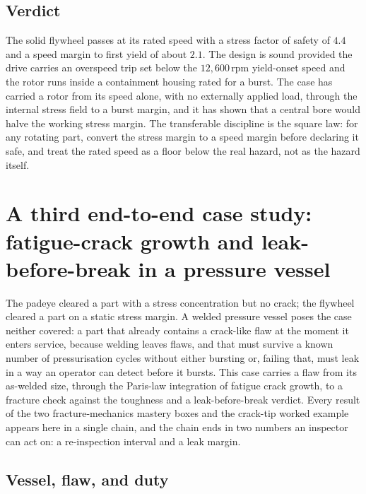 \subsection{Verdict}

The solid flywheel passes at its rated speed with a stress factor of
safety of $4.4$ and a speed margin to first yield of about $2.1$. The
design is sound provided the drive carries an overspeed trip set below
the $12{,}600\,\text{rpm}$ yield-onset speed and the rotor runs inside a
containment housing rated for a burst. The case has carried a rotor from
its speed alone, with no externally applied load, through the internal
stress field to a burst margin, and it has shown that a central bore
would halve the working stress margin. The transferable discipline is
the square law: for any rotating part, convert the stress margin to a
speed margin before declaring it safe, and treat the rated speed as a
floor below the real hazard, not as the hazard itself.

\section{A third end-to-end case study: fatigue-crack growth and
leak-before-break in a pressure vessel}

The padeye cleared a part with a stress concentration but no crack; the
flywheel cleared a part on a static stress margin. A welded pressure
vessel poses the case neither covered: a part that already contains a
crack-like flaw at the moment it enters service, because welding leaves
flaws, and that must survive a known number of pressurisation cycles
without either bursting or, failing that, must leak in a way an operator
can detect before it bursts. This case carries a flaw from its
as-welded size, through the Paris-law integration of fatigue crack
growth, to a fracture check against the toughness and a leak-before-break
verdict. Every result of the two fracture-mechanics mastery boxes and the
crack-tip worked example appears here in a single chain, and the chain
ends in two numbers an inspector can act on: a re-inspection interval and
a leak margin.

\subsection{Vessel, flaw, and duty}

